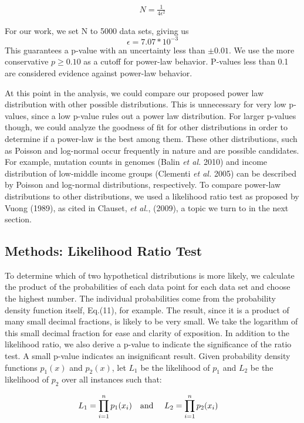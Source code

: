 \documentclass[12pt]{article}
\begin{document}
\begin{align}
N = \frac{1}{4{\epsilon}^2}
\end{align}

For our work, we set N to 5000 data sets, giving us $$\epsilon  = 7.07*10^{-3}$$ This guarantees a p-value with an uncertainty less than  $\pm0.01$. We use the more conservative $p \geq 0.10$ as a cutoff for power-law behavior. P-values less than 0.1 are considered evidence against power-law behavior.  

At this point in the analysis, we could compare our proposed power law distribution with other possible distributions.  This is unnecessary for very low p-values, since a low p-value rules out a power law distribution.  For larger p-values though, we could analyze the goodness of fit for other distributions in order to determine if a power-law is the best among them.  These other distributions, such as Poisson and log-normal occur frequently in nature and are possible candidates.  For example, mutation counts in genomes (Balin \emph{et al.} 2010) and income distribution of low-middle income groups (Clementi \emph{et al.} 2005) can be described by Poisson and log-normal distributions, respectively.  To compare power-law distributions to other distributions, we used a likelihood ratio test as proposed by Vuong (1989), as cited in Clauset, \emph{et al.}, (2009), a topic we turn to in the next section.


\subsection{Methods: Likelihood Ratio Test}

To determine which of two hypothetical distributions is more likely,  we  calculate the product of the probabilities of each data point for each data set and choose the highest number.  The individual probabilities come from the probability density function itself, Eq.(11), for example.  The result, since it is a product of many small decimal fractions, is likely to be very small. We take the logarithm of this small decimal fraction for ease and clarity of exposition.   In addition to the likelihood ratio, we also derive a p-value to indicate the significance of the ratio test.  A small p-value indicates an insignificant result.  Given probability density functions $p_{1}(x)$ and $p_{2}(x)$,  let $L_1$ be the likelihood of $p_1$ and $L_2$ be the likelihood of $p_2$ over all instances such that:

\begin{align*}
L_{1} = \prod_{i=1}^{n} p_{1}(x_{i}) \text{\quad and \quad} & L_{2} = \prod_{i=1}^{n} p_{2}(x_{i})
\end{align*}
\end{document}
